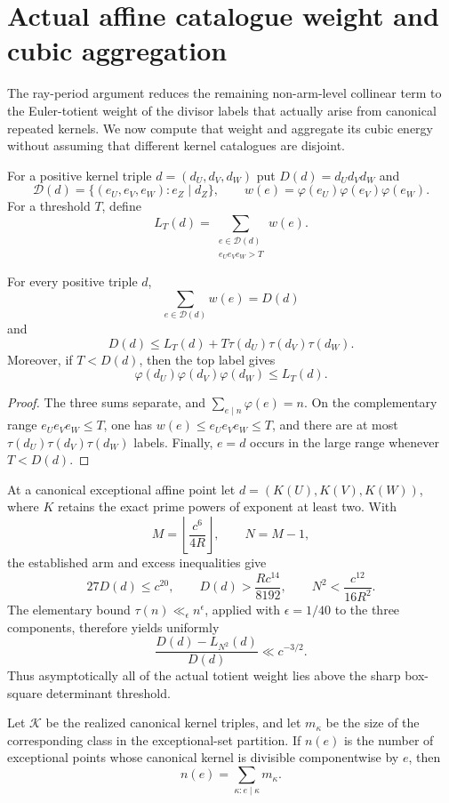 \section{Actual affine catalogue weight and cubic aggregation}
\label{sec:affine-catalogue-weight-overlap}

The ray-period argument reduces the remaining non-arm-level collinear term
to the Euler-totient weight of the divisor labels that actually arise from
canonical repeated kernels.  We now compute that weight and aggregate its
cubic energy without assuming that different kernel catalogues are
disjoint.

For a positive kernel triple
$d=(d_U,d_V,d_W)$ put $D(d)=d_Ud_Vd_W$ and
\[
 \mathcal D(d)=\{(e_U,e_V,e_W):e_Z\mid d_Z\},\qquad
 w(e)=\varphi(e_U)\varphi(e_V)\varphi(e_W).
\]
For a threshold $T$, define
\[
 L_T(d)=\sum_{\substack{e\in\mathcal D(d)\\e_Ue_Ve_W>T}}w(e).
\]

\begin{theorem}
\label{thm:affine-actual-catalogue-tail}
For every positive triple $d$,
\[
 \sum_{e\in\mathcal D(d)}w(e)=D(d)
\]
and
\[
 D(d)\le L_T(d)+T\tau(d_U)\tau(d_V)\tau(d_W).
\]
Moreover, if $T<D(d)$, then the top label gives
\[
 \varphi(d_U)\varphi(d_V)\varphi(d_W)\le L_T(d).
\]
\end{theorem}

\begin{proof}
The three sums separate, and
$\sum_{e\mid n}\varphi(e)=n$.  On the complementary range
$e_Ue_Ve_W\le T$, one has
$w(e)\le e_Ue_Ve_W\le T$, and there are at most
$\tau(d_U)\tau(d_V)\tau(d_W)$ labels.  Finally, $e=d$ occurs in the large
range whenever $T<D(d)$.
\end{proof}

At a canonical exceptional affine point let
$d=(K(U),K(V),K(W))$, where $K$ retains the exact prime powers of exponent
at least two.  With
\[
 M=\left\lfloor\frac{c^6}{4R}\right\rfloor,
 \qquad N=M-1,
\]
the established arm and excess inequalities give
\[
 27D(d)\le c^{20},\qquad
 D(d)>\frac{Rc^{14}}{8192},\qquad
 N^2<\frac{c^{12}}{16R^2}.
\]
The elementary bound $\tau(n)\ll_\epsilon n^\epsilon$, applied with
$\epsilon=1/40$ to the three components, therefore yields uniformly
\[
 \frac{D(d)-L_{N^2}(d)}{D(d)}
 \ll c^{-3/2}.
\]
Thus asymptotically all of the actual totient weight lies above the sharp
box-square determinant threshold.

Let $\mathcal K$ be the realized canonical kernel triples, and let
$m_\kappa$ be the size of the corresponding class in the exceptional-set
partition.  If $n(e)$ is the number of exceptional points whose canonical
kernel is divisible componentwise by $e$, then
\[
       n(e)=\sum_{\kappa:e\mid\kappa}m_\kappa.
\]

